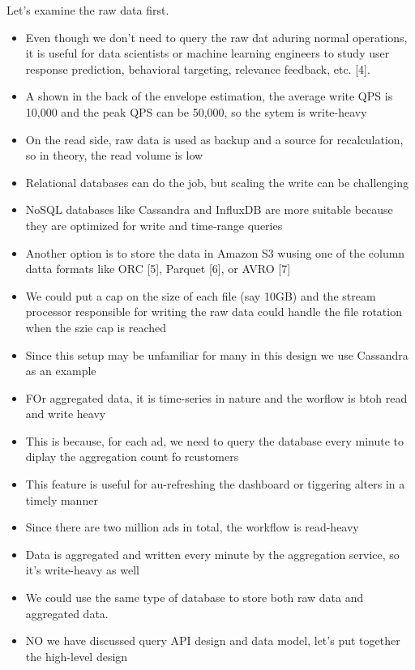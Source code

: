 \documentclass{report}
\theoremstyle{definition}
\begin{document}
Let's examine the raw data first.

\begin{itemize}
\item
Even though we don't need to query the raw dat aduring normal operations, it is useful for data scientists or machine learning engineers to study user response prediction, behavioral targeting, relevance feedback, etc. [4].
\item
A shown in the back of the envelope estimation, the average write QPS is 10,000 and the peak QPS can be 50,000, so the sytem is write-heavy
\item
On the read side, raw data is used as backup and a source for recalculation, so in theory, the read volume is low
\item
Relational databases can do the job, but scaling the write can be challenging
\item
NoSQL databases like Cassandra and InfluxDB are more suitable because they are optimized for write and time-range queries
\item
Another option is to store the data in Amazon S3 wusing one of the column datta formats like ORC [5], Parquet [6], or AVRO [7]
\item
We could put a cap on the size of each file (say 10GB) and the stream processor responsible for writing the raw data could handle the file rotation when the szie cap is reached
\item
Since this setup may be unfamiliar for many in this design we use Cassandra as an example
\item
FOr aggregated data, it is time-series in nature and the worflow is btoh read and write heavy
\item
This is because, for each ad, we need to query the database every minute to diplay the aggregation count fo rcustomers
\item
This feature is useful for au-refreshing the dashboard or tiggering alters in a timely manner
\item
Since there are two million ads in total,  the workflow is read-heavy
\item
Data is aggregated and written every minute by the aggregation service, so it's write-heavy as well
\item
We could use the same type of database to store both raw data and aggregated data.
\item
NO we have discussed query API design and data model, let's put together the high-level design
\end{itemize}
\end{document}
